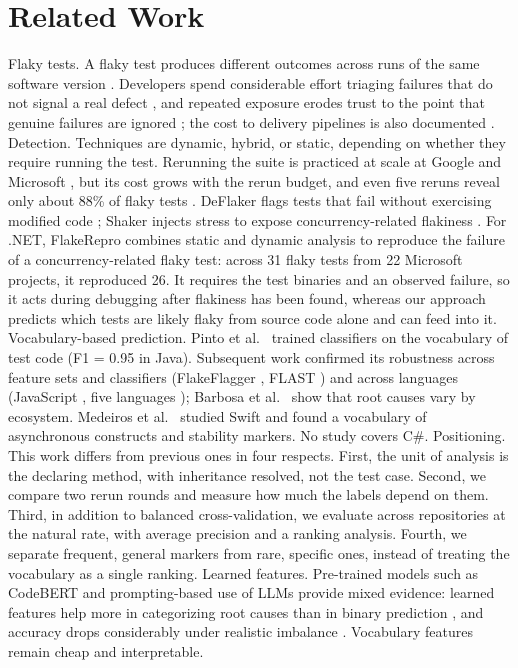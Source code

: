 \section{Related Work}
Flaky tests. A flaky test produces different outcomes across runs of the same software version \cite{luo2014empirical}. Developers spend considerable effort triaging failures that do not signal a real defect \cite{pinto2020vocabulary}, and repeated exposure erodes trust to the point that genuine failures are ignored \cite{gruber2022survey, rahman2018impact}; the cost to delivery pipelines is also documented \cite{herzig2015empirically, micco2017state}.
Detection. Techniques are dynamic, hybrid, or static, depending on whether they require running the test. Rerunning the suite is practiced at scale at Google and Microsoft \cite{lam2020study, micco2017state}, but its cost grows with the rerun budget, and even five reruns reveal only about 88\% of flaky tests \cite{lam2020understanding}. DeFlaker flags tests that fail without exercising modified code \cite{bell2018deflaker}; Shaker injects stress to expose concurrency-related flakiness \cite{silva2020shake}. For .NET, FlakeRepro \cite{leesatapornwongsa2022flakerepro} combines static and dynamic analysis to reproduce the failure of a concurrency-related flaky test: across 31 flaky tests from 22 Microsoft projects, it reproduced 26. It requires the test binaries and an observed failure, so it acts during debugging after flakiness has been found, whereas our approach predicts which tests are likely flaky from source code alone and can feed into it.
Vocabulary-based prediction. Pinto et al.\ \cite{pinto2020vocabulary} trained classifiers on the vocabulary of test code (F1 = 0.95 in Java). Subsequent work confirmed its robustness across feature sets and classifiers (FlakeFlagger \cite{alshammari2021flakeflagger}, FLAST \cite{verdecchia2021know}) and across languages (JavaScript \cite{soratto2023vocabulary}, five languages \cite{ahmad2025understanding}); Barbosa et al.\ \cite{barbosa2022test} show that root causes vary by ecosystem. Medeiros et al.\ \cite{medeiros2026vocabulary} studied Swift and found a vocabulary of asynchronous constructs and stability markers. No study covers C\#.
Positioning. This work differs from previous ones in four respects. First, the unit of analysis is the declaring method, with inheritance resolved, not the test case. Second, we compare two rerun rounds and measure how much the labels depend on them. Third, in addition to balanced cross-validation, we evaluate across repositories at the natural rate, with average precision and a ranking analysis. Fourth, we separate frequent, general markers from rare, specific ones, instead of treating the vocabulary as a single ranking.
Learned features. Pre-trained models such as CodeBERT \cite{fatima2022flakify} and prompting-based use of LLMs \cite{berndt2026can} provide mixed evidence: learned features help more in categorizing root causes than in binary prediction \cite{rahman2024quantizing}, and accuracy drops considerably under realistic imbalance \cite{rahman2025understanding}. Vocabulary features remain cheap and interpretable.